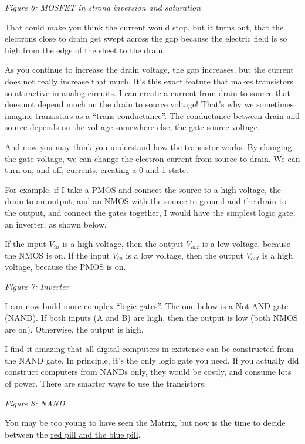 \emph{Figure 6: MOSFET in strong inversion and saturation }

That could make you think the current would stop, but it turns out, that
the electrons close to drain get swept across the gap because the
electric field is so high from the edge of the sheet to the drain.

As you continue to increase the drain voltage, the gap increases, but
the current does not really increase that much. It's this exact feature
that makes transistors so attractive in analog circuits. I can create a
current from drain to source that does not depend much on the drain to
source voltage! That's why we sometimes imagine transistors as a
``trans-conductance''. The conductance between drain and source depends
on the voltage somewhere else, the gate-source voltage.

And now you may think you understand how the transistor works. By
changing the gate voltage, we can change the electron current from
source to drain. We can turn on, and off, currents, creating a 0 and 1
state.

For example, if I take a PMOS and connect the source to a high voltage,
the drain to an output, and an NMOS with the source to ground and the
drain to the output, and connect the gates together, I would have the
simplest logic gate, an inverter, as shown below.

If the input \(V_{in}\) is a high voltage, then the output \(V_{out}\)
is a low voltage, because the NMOS is on. If the input \(V_{in}\) is a
low voltage, then the output \(V_{out}\) is a high voltage, because the
PMOS is on.


{
\centering
{}
}

\emph{Figure 7: Inverter }

I can now build more complex ``logic gates''. The one below is a Not-AND
gate (NAND). If both inputs (A and B) are high, then the output is low
(both NMOS are on). Otherwise, the output is high.

I find it amazing that all digital computers in existence can be
constructed from the NAND gate. In principle, it's the only logic gate
you need. If you actually did construct computers from NANDs only, they
would be costly, and consume lots of power. There are smarter ways to
use the transistors.


{
\centering
{}
}

\emph{Figure 8: NAND }

You may be too young to have seen the Matrix, but now is the time to
decide between the
\href{https://en.m.wikipedia.org/wiki/Red_pill_and_blue_pill}{red pill
and the blue pill}.

